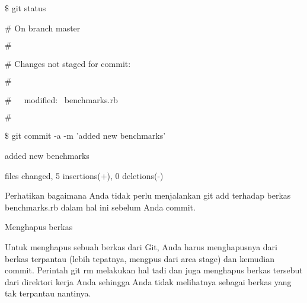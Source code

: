 \vspace{14pt}
\noindent 
{\fontsize{14pt}{14pt}\selectfont  $  \$  $ git status \\} \par
\noindent 
{\fontsize{14pt}{14pt}\selectfont  $  \#  $ On branch master \\} \par
\noindent 
{\fontsize{14pt}{14pt}\selectfont  $  \#  $ \\} \par
\noindent 
{\fontsize{14pt}{14pt}\selectfont  $  \#  $ Changes not staged for commit: \\} \par
\noindent 
{\fontsize{14pt}{14pt}\selectfont  $  \#  $ \\} \par
\noindent 
{\fontsize{14pt}{14pt}\selectfont  $  \#  $~~~modified:~  benchmarks.rb \\} \par
\noindent 
{\fontsize{14pt}{14pt}\selectfont  $  \#  $ \\} \par
\noindent 
{\fontsize{14pt}{14pt}\selectfont  $  \$  $ git commit -a -m 'added new benchmarks' \\} \par
\noindent 
{\fontsize{14pt}{14pt}\selectfont [master 83e38c7] added new benchmarks \\} \par
\noindent 
{\fontsize{14pt}{14pt} files changed, 5 insertions(+), 0 deletions(-) \\} \par
\vspace{14pt}
\noindent 
{\fontsize{14pt}{14pt}\selectfont Perhatikan bagaimana Anda tidak perlu menjalankan $  $git add $  $terhadap berkas benchmarks.rb dalam hal ini sebelum Anda commit. \\} \par
\vspace{14pt}
\noindent 
{\fontsize{14pt}{14pt}\selectfont Menghapus berkas \\} \par
\noindent 
{\fontsize{14pt}{14pt}\selectfont Untuk menghapus sebuah berkas dari Git, Anda harus menghapusnya dari berkas terpantau (lebih tepatnya, mengpus dari area stage) dan kemudian commit. Perintah $  $git rm $  $melakukan hal tadi dan juga menghapus berkas tersebut dari direktori kerja Anda sehingga Anda tidak melihatnya sebagai berkas yang tak terpantau nantinya. \\} \par
